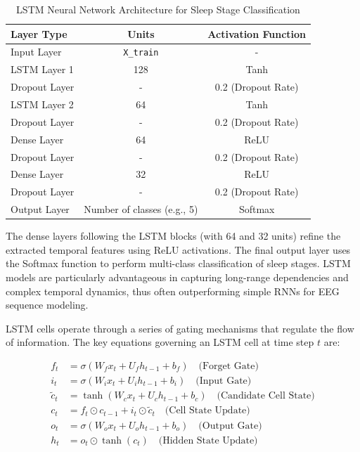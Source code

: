 \begin{table}[H]
	\centering
	\caption{LSTM Neural Network Architecture for Sleep Stage Classification}
	\label{tab:lstm_architecture}
	\begin{tabular}{lcc}
		\hline
		\textbf{Layer Type} & \textbf{Units} & \textbf{Activation Function} \\
		\hline
		Input Layer         & \texttt{X\_train}           & - \\
		LSTM Layer 1        & 128                         & Tanh \\
		Dropout Layer       & -                           & 0.2 (Dropout Rate) \\
		LSTM Layer 2        & 64                          & Tanh \\
		Dropout Layer       & -                           & 0.2 (Dropout Rate) \\
		Dense Layer         & 64                          & ReLU \\
		Dropout Layer       & -                           & 0.2 (Dropout Rate) \\
		Dense Layer         & 32                          & ReLU \\
		Dropout Layer       & -                           & 0.2 (Dropout Rate) \\
		Output Layer        & Number of classes (e.g., 5) & Softmax \\
		\hline
	\end{tabular}
\end{table}

The dense layers following the LSTM blocks (with 64 and 32 units) refine the extracted temporal features using ReLU activations. The final output layer uses the Softmax function to perform multi-class classification of sleep stages. LSTM models are particularly advantageous in capturing long-range dependencies and complex temporal dynamics, thus often outperforming simple RNNs for EEG sequence modeling.

LSTM cells operate through a series of gating mechanisms that regulate the flow of information. The key equations governing an LSTM cell at time step \( t \) are:

\begin{align}
	f_t &= \sigma(W_f x_t + U_f h_{t-1} + b_f) \quad \text{(Forget Gate)} \\
	i_t &= \sigma(W_i x_t + U_i h_{t-1} + b_i) \quad \text{(Input Gate)} \\
	\tilde{c}_t &= \tanh(W_c x_t + U_c h_{t-1} + b_c) \quad \text{(Candidate Cell State)} \\
	c_t &= f_t \odot c_{t-1} + i_t \odot \tilde{c}_t \quad \text{(Cell State Update)} \\
	o_t &= \sigma(W_o x_t + U_o h_{t-1} + b_o) \quad \text{(Output Gate)} \\
	h_t &= o_t \odot \tanh(c_t) \quad \text{(Hidden State Update)}
\end{align}


